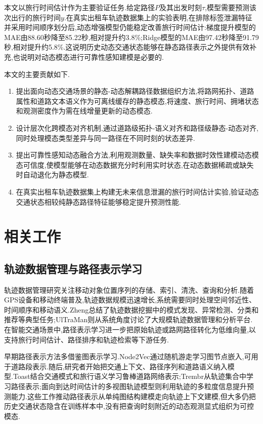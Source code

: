 \documentclass{rjthesis}
\begin{document}
本文以旅行时间估计作为主要验证任务.给定路径$P$及其出发时刻$\tau$,模型需要预测该次出行的旅行时间$y$.在真实出租车轨迹数据集上的实验表明,在排除标签泄漏特征并采用时间顺序划分后,动态增强模型仍能稳定改善旅行时间估计:梯度提升模型的MAE由88.60秒降至85.22秒,相对提升约3.8\%;Ridge模型的MAE由97.42秒降至91.79秒,相对提升约5.8\%.这说明历史动态交通状态能够在静态路径表示之外提供有效补充,也说明对动态模态进行可靠性感知建模是必要的.

本文的主要贡献如下.
\begin{enumerate}
	\item 提出面向动态交通场景的静态-动态解耦路径数据组织方法,将路网拓扑、道路属性和道路文本语义作为可离线缓存的静态模态,将速度、旅行时间、拥堵状态和观测密度作为需在线增量更新的动态模态.
	\item 设计层次化跨模态对齐机制,通过道路级拓扑-语义对齐和路径级静态-动态对齐,同时处理模态类型差异与同一路径在不同时刻的状态差异.
	\item 提出可靠性感知动态融合方法,利用观测数量、缺失率和数据时效性建模动态模态可信度,使模型能够在动态数据充分时利用实时状态,在动态数据稀疏或缺失时自动退化为静态模型.
	\item 在真实出租车轨迹数据集上构建无未来信息泄漏的旅行时间估计实验,验证动态交通状态相较纯静态路径特征能够稳定提升预测性能.
\end{enumerate}

\section{相关工作}

\subsection{轨迹数据管理与路径表示学习}

轨迹数据管理研究关注移动对象位置序列的存储、索引、清洗、查询和分析.随着GPS设备和移动终端普及,轨迹数据规模迅速增长,系统需要同时处理空间邻近性、时间顺序和移动语义.Zheng\cite{zheng2015trajectory}总结了轨迹数据挖掘中的模式发现、异常检测、分类和推荐等典型任务;UlTraMan\cite{ding2018ultraman}则从系统角度讨论了大规模轨迹数据管理和分析平台.在智能交通场景中,路径表示学习进一步把原始轨迹或路网路径转化为低维向量,以支持旅行时间估计、路径排序和轨迹检索等下游任务.

早期路径表示方法多借鉴图表示学习.Node2Vec\cite{grover2016node2vec}通过随机游走学习图节点嵌入,可用于道路段表示.随后,研究者开始把交通上下文、路径序列和道路语义纳入模型.Toast\cite{chen2021toast}结合交通模式和旅行语义学习鲁棒道路网络表示;Trembr\cite{fu2020trembr}从轨迹集合中学习路径表示;面向到达时间估计的多视图轨迹模型\cite{chen2022eta}则利用轨迹的多粒度信息提升预测能力.这些工作推动路径表示从单纯图结构建模走向轨迹上下文建模,但大多仍把历史交通状态隐含在训练样本中,没有把查询时刻附近的动态观测显式组织为可控模态.
\end{document}
